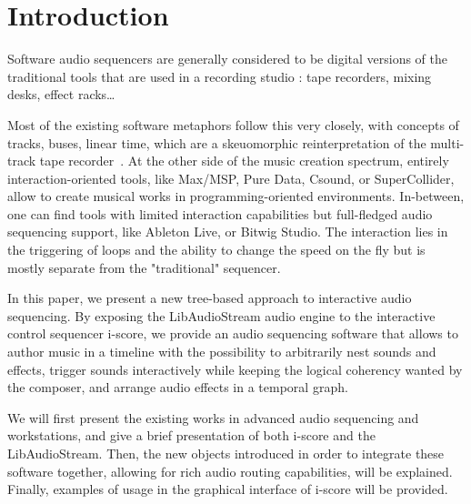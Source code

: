 \documentclass{article}
\title{\papertitle}
\begin{document}
%
\capstartfalse
\maketitle
\capstarttrue
%
\begin{abstract}
Place your abstract at the top left column on the first page.
Please write about 150--200 words that specifically highlight the purpose of your work,
its context, and provide a brief synopsis of your results.
Avoid equations in this part.
\end{abstract}

\section{Introduction}
Software audio sequencers are generally considered to be digital versions 
of the traditional tools that are used in a recording studio : tape recorders, 
mixing desks, effect racks\dots

Most of the existing software metaphors follow this very closely, with 
concepts of tracks, buses, linear time, which are a skeuomorphic reinterpretation of the multi-track tape recorder~\cite{bell2015skeuomorphism}.
At the other side of the music creation spectrum, entirely interaction-oriented tools, 
like Max/MSP, Pure Data, Csound, or SuperCollider, allow to create musical works in programming-oriented 
environments.
In-between, one can find tools with limited interaction capabilities but full-fledged audio sequencing support, 
like Ableton Live, or Bitwig Studio.
The interaction lies in the triggering of loops and the ability to change the speed on the fly but is mostly separate from the "traditional" sequencer.

In this paper, we present a new tree-based approach to interactive audio sequencing.
By exposing the LibAudioStream audio engine to the interactive control sequencer i-score, 
we provide an audio sequencing software that allows to author music in a timeline 
with the possibility to arbitrarily nest sounds and effects, trigger sounds interactively 
while keeping the logical coherency wanted by the composer, and arrange audio effects in a temporal graph.

We will first present the existing works in advanced audio sequencing and workstations, 
and give a brief presentation of both i-score and the LibAudioStream.
Then, the new objects introduced in order to integrate these software together, allowing 
for rich audio routing capabilities, will be explained.
Finally, examples of usage in the graphical interface of i-score will be provided.
\end{document}
